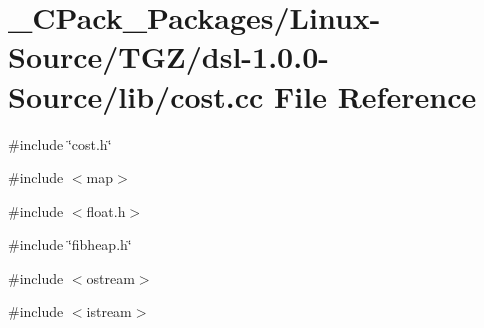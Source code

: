 \section{\_\-CPack\_\-Packages/Linux-\/Source/TGZ/dsl-\/1.0.0-\/Source/lib/cost.cc File Reference}
\label{__CPack__Packages_2Linux-Source_2TGZ_2dsl-1_80_80-Source_2lib_2cost_8cc}
{\ttfamily \#include \char`\"{}cost.h\char`\"{}}\par
{\ttfamily \#include $<$map$>$}\par
{\ttfamily \#include $<$float.h$>$}\par
{\ttfamily \#include \char`\"{}fibheap.h\char`\"{}}\par
{\ttfamily \#include $<$ostream$>$}\par
{\ttfamily \#include $<$istream$>$}\par
